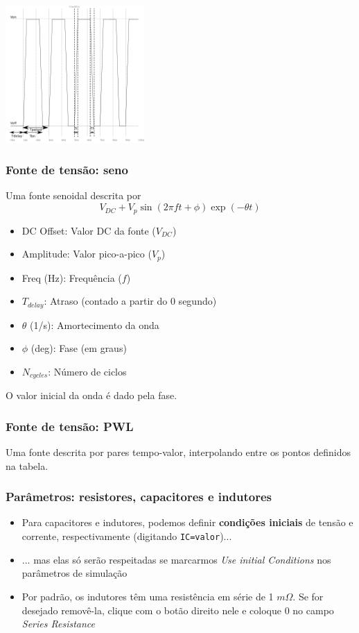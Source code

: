 \documentclass{beamer}
\begin{document}
 \begin{frame}
 \begin{center}
 \includegraphics[width=200px]{images/square_wave}
 \end{center}
 \end{frame}
\begin{frame} %
\frametitle{Fonte de tensão: seno}
Uma fonte senoidal descrita por
\begin{equation}
V_{DC} + V_{p} \sin (2 \pi f t + \phi) \exp(-\theta t)
\end{equation}
\begin{itemize}
\item{DC Offset}: Valor DC da fonte ($V_{DC}$)
\item{Amplitude}: Valor pico-a-pico ($V_{p}$)
\item{Freq (Hz)}: Frequência ($f$)
\item{$T_{delay}$}: Atraso (contado a partir do 0 segundo)
\item{$\theta$ (1/s)}: Amortecimento da onda
\item{$\phi$ (deg)}: Fase (em graus)
\item{$N_{cycles}$}: Número de ciclos
\end{itemize}
O valor inicial da onda é dado pela fase.
\end{frame}

\begin{frame}
\frametitle{Fonte de tensão: PWL}
Uma fonte descrita por pares tempo-valor, interpolando entre os pontos definidos na tabela.
\end{frame}

\begin{frame}
\frametitle{Parâmetros: resistores, capacitores e indutores}
\begin{itemize}
\item{Para capacitores e indutores, podemos definir \textbf{condições iniciais} de tensão e corrente, respectivamente (digitando \texttt{IC=valor})...}
\item{... mas elas só serão respeitadas se marcarmos \textit{Use initial Conditions} nos parâmetros de simulação}
\item{Por padrão, os indutores têm uma resistência em série de 1 $m\Omega$. Se for desejado removê-la, clique com o botão direito nele e coloque 0 no campo \textit{Series Resistance}}
\end{itemize}
\end{frame}
\end{document}
